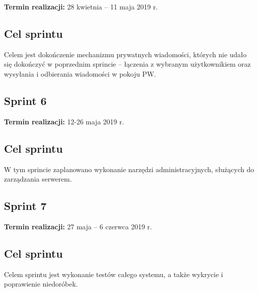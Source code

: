 \textbf{Termin realizacji:} 28 kwietnia -- 11 maja 2019 r.

\subsection{Cel sprintu}
Celem jest dokończenie mechanizmu prywatnych wiadomości, których nie udało się
dokończyć w poprzednim sprincie -- łączenia z wybranym użytkownikiem oraz
wysyłania i odbierania wiadomości w pokoju PW.

\subsection{Sprint 6}

\textbf{Termin realizacji:} 12-26 maja 2019 r.

\subsection{Cel sprintu}
W tym sprincie zaplanowano wykonanie narzędzi administracyjnych, służących
do zarządzania serwerem.

\subsection{Sprint 7}

\textbf{Termin realizacji:} 27 maja -- 6 czerwca 2019 r.

\subsection{Cel sprintu}
Celem sprintu jest wykonanie testów całego systemu, a także wykrycie i
poprawienie niedoróbek.
